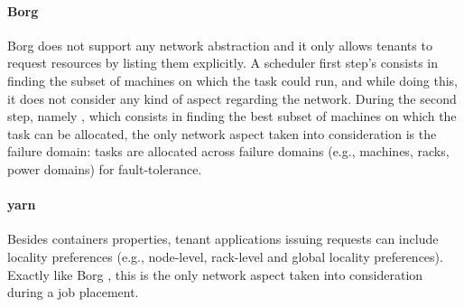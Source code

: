 \paragraph{Borg \texorpdfstring{\cite{borg}}{}}
Borg \cite{borg} does not support any network abstraction and it only allows tenants to request resources by listing them explicitly.
A scheduler first step's consists in finding the subset of machines on which the task could run, and while doing this, it does not consider any kind of aspect regarding the network.
During the second step, namely , which consists in finding the best subset of machines on which the task can be allocated, the only network aspect taken into consideration is the failure domain: tasks are allocated across failure domains (e.g., machines, racks, power domains) for fault-tolerance.



\paragraph{\glsdesc{yarn}}
Besides containers properties, tenant applications issuing requests can include locality preferences (e.g., node-level, rack-level and global locality preferences).
Exactly like Borg \cite{borg}, this is the only network aspect taken into consideration during a job placement.